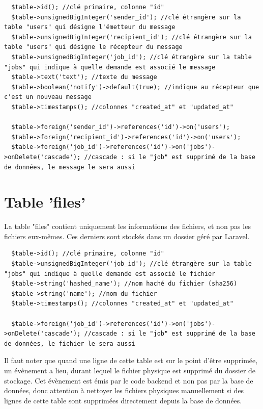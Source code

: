 \documentclass[
    iai, %
    eai, %
]{heig-tb}
\begin{document}
\begin{verbatim}
  $table->id(); //clé primaire, colonne "id"
  $table->unsignedBigInteger('sender_id'); //clé étrangère sur la table "users" qui désigne l'émetteur du message
  $table->unsignedBigInteger('recipient_id'); //clé étrangère sur la table "users" qui désigne le récepteur du message
  $table->unsignedBigInteger('job_id'); //clé étrangère sur la table "jobs" qui indique à quelle demande est associé le message
  $table->text('text'); //texte du message
  $table->boolean('notify')->default(true); //indique au récepteur que c'est un nouveau message
  $table->timestamps(); //colonnes "created_at" et "updated_at"

  $table->foreign('sender_id')->references('id')->on('users');
  $table->foreign('recipient_id')->references('id')->on('users');
  $table->foreign('job_id')->references('id')->on('jobs')->onDelete('cascade'); //cascade : si le "job" est supprimé de la base de données, le message le sera aussi
\end{verbatim}

\section{Table 'files'}
La table "files" contient uniquement les informations des fichiers, et non pas les fichiers eux-mêmes. Ces derniers sont stockés dans un dossier géré par Laravel.

\begin{verbatim}
  $table->id(); //clé primaire, colonne "id"
  $table->unsignedBigInteger('job_id'); //clé étrangère sur la table "jobs" qui indique à quelle demande est associé le fichier
  $table->string('hashed_name'); //nom haché du fichier (sha256)
  $table->string('name'); //nom du fichier
  $table->timestamps(); //colonnes "created_at" et "updated_at"

  $table->foreign('job_id')->references('id')->on('jobs')->onDelete('cascade'); //cascade : si le "job" est supprimé de la base de données, le fichier le sera aussi
\end{verbatim}

Il faut noter que quand une ligne de cette table est sur le point d'être supprimée, un évènement a lieu, durant lequel le fichier physique est supprimé du dossier de stockage.
Cet évènement est émis par le code backend et non pas par la base de données, donc attention à nettoyer les fichiers physiques manuellement si des lignes de cette table sont supprimées directement depuis la base de données.
\end{document}
